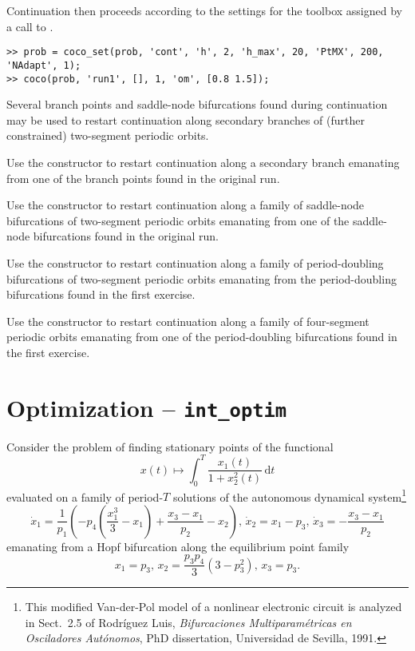 Continuation then proceeds according to the settings for the  toolbox assigned by a call to .
\begin{lstlisting}[language=coco-highlight]
>> prob = coco_set(prob, 'cont', 'h', 2, 'h_max', 20, 'PtMX', 200, 'NAdapt', 1);
>> coco(prob, 'run1', [], 1, 'om', [0.8 1.5]);
\end{lstlisting}
Several branch points and saddle-node bifurcations found during continuation may be used to restart continuation along secondary branches of (further constrained) two-segment periodic orbits.\\
\medskip

\begin{exercises}

\item Use the  constructor to restart continuation along a secondary branch emanating from one of the branch points found in the original run.

\item Use the  constructor to restart continuation along a family of saddle-node bifurcations of two-segment periodic orbits emanating from one of the saddle-node bifurcations found in the original run.

\item Use the  constructor to restart continuation along a family of period-doubling bifurcations of two-segment periodic orbits emanating from the period-doubling bifurcations found in the first exercise.

\item Use the  constructor to restart continuation along a family of four-segment periodic orbits emanating from one of the period-doubling bifurcations found in the first exercise.

\end{exercises}

\section{Optimization -- \texttt{int\_optim}}

Consider the problem of finding stationary points of the functional
\begin{equation}
x(t)\mapsto\int_0^T \frac{x_1(t)}{1+x_2^2(t)}\,\mathrm{d}t
\end{equation}
evaluated on a family of period-$T$ solutions of the autonomous dynamical system\footnote{This modified Van-der-Pol model of a nonlinear electronic circuit is analyzed in Sect.~2.5 of Rodr\'{i}guez Luis, \emph{Bifurcaciones Multiparam\'{e}tricas en Osciladores Aut\'{o}nomos}, PhD dissertation, Universidad de Sevilla, 1991.}
\begin{equation}
\dot{x}_1=\frac{1}{p_1}\left(-p_4\left(\frac{x_1^3}{3}-x_1\right)+\frac{x_3-x_1}{p_2}-x_2\right),\,\dot{x}_2=x_1-p_3,\,\dot{x}_3=-\frac{x_3-x_1}{p_2}
\end{equation}
emanating from a Hopf bifurcation along the equilibrium point family
\begin{equation}
x_1=p_3,\,x_2=\frac{p_3p_4}{3}(3-p_3^2),\,x_3=p_3.
\end{equation}


